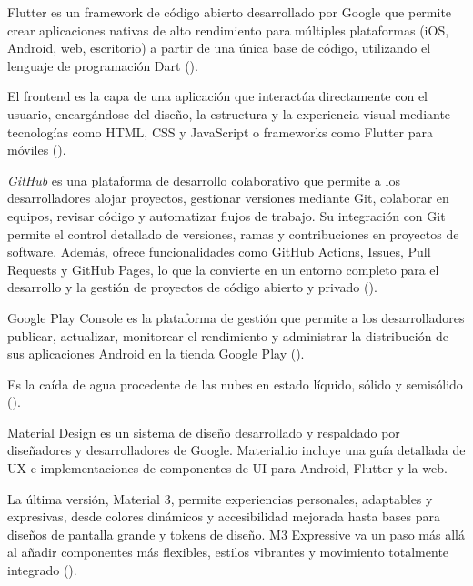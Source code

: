 \begin{definition}[Flutter]
Flutter es un framework de código abierto desarrollado por Google que permite crear aplicaciones nativas de alto rendimiento para múltiples plataformas (iOS, Android, web, escritorio) a partir de una única base de código, utilizando el lenguaje de programación Dart (\cite{flutter_multiplataforma}).
\end{definition}

\begin{definition}[Frontend]
El frontend es la capa de una aplicación que interactúa directamente con el usuario, encargándose del diseño, la estructura y la experiencia visual mediante tecnologías como HTML, CSS y JavaScript o frameworks como Flutter para móviles (\cite{frontend}).
\end{definition}

\begin{definition}[GitHub]
\textit{GitHub} es una plataforma de desarrollo colaborativo que permite a los desarrolladores alojar proyectos, gestionar versiones mediante Git, colaborar en equipos, revisar código y automatizar flujos de trabajo. Su integración con Git permite el control detallado de versiones, ramas y contribuciones en proyectos de software. Además, ofrece funcionalidades como GitHub Actions, Issues, Pull Requests y GitHub Pages, lo que la convierte en un entorno completo para el desarrollo y la gestión de proyectos de código abierto y privado (\cite{githubdocs}).
\end{definition}

\begin{definition}
Google Play Console es la plataforma de gestión que permite a los desarrolladores publicar, actualizar, monitorear el rendimiento y administrar la distribución de sus aplicaciones Android en la tienda Google Play (\cite{googleplayconsole}).
\end{definition}

\begin{definition}[Lluvia]
Es la caída de agua procedente de las nubes en estado líquido, sólido y semisólido (\cite{breña2013}).
\end{definition}

\begin{definition}
Material Design es un sistema de diseño desarrollado y respaldado por diseñadores y desarrolladores de Google. Material.io incluye una guía detallada de UX e implementaciones de componentes de UI para Android, Flutter y la web.

La última versión, Material 3, permite experiencias personales, adaptables y expresivas, desde colores dinámicos y accesibilidad mejorada hasta bases para diseños de pantalla grande y tokens de diseño. M3 Expressive va un paso más allá al añadir componentes más flexibles, estilos vibrantes y movimiento totalmente integrado (\cite{materialdesign2023}). 
\end{definition}

